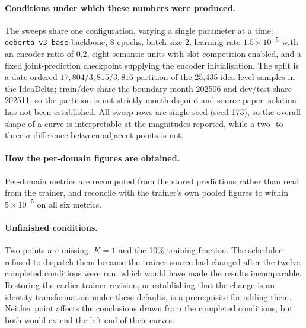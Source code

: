 \paragraph{Conditions under which these numbers were produced.}
The sweeps share one configuration, varying a single parameter at a time:
\texttt{deberta-v3-base} backbone, 8 epochs, batch size 2, learning rate
$1.5\times10^{-5}$ with an encoder ratio of 0.2, eight semantic units with slot
competition enabled, and a fixed joint-prediction checkpoint supplying the
encoder initialisation. The split is a date-ordered
$17{,}804/3{,}815/3{,}816$ partition of the 25{,}435 idea-level samples in the
IdeaDelta; train/dev share the boundary month 202506 and dev/test share
202511, so the partition is not strictly month-disjoint and source-paper
isolation has not been established. All sweep rows are single-seed (seed 173),
so the overall shape of a curve is interpretable at the magnitudes reported,
while a two- to three-$\sigma$ difference between adjacent points is not.

\paragraph{How the per-domain figures are obtained.}
Per-domain metrics are recomputed from the stored predictions rather than read
from the trainer, and reconcile with the trainer's own pooled figures to within
$5\times10^{-5}$ on all six metrics.

\paragraph{Unfinished conditions.}
Two points are missing: $K{=}1$ and the 10\% training fraction. The scheduler
refused to dispatch them because the trainer source had changed after the twelve
completed conditions were run, which would have made the results incomparable.
Restoring the earlier trainer revision, or establishing that the change is an
identity transformation under these defaults, is a prerequisite for adding them.
Neither point affects the conclusions drawn from the completed conditions, but
both would extend the left end of their curves.
